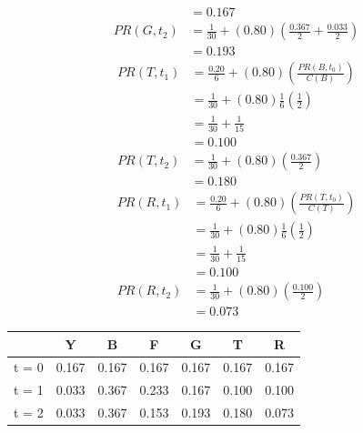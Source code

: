 \documentclass[11pt]{article}
\begin{document}
\begin{enumerate}
\begin{enumerate}
\begin{align*}
                &= 0.167 \\
                PR(G,t_{2}) &= \frac{1}{30}+(0.80)\left(\frac{0.367}{2}+\frac{0.033}{2}\right) \\
                &= 0.193
            \end{align*}
            \begin{align*}
                PR(T,t_{1}) &= \frac{0.20}{6}+(0.80)\left(\frac{PR(B,t_{0})}{C(B)}\right) \\
                &= \frac{1}{30}+(0.80)\frac{1}{6}\left(\frac{1}{2}\right) \\
                &= \frac{1}{30}+\frac{1}{15} \\
                &= 0.100 \\
                PR(T,t_{2}) &= \frac{1}{30}+(0.80)\left(\frac{0.367}{2}\right) \\
                &= 0.180
            \end{align*}
            \begin{align*}
                PR(R,t_{1}) &= \frac{0.20}{6}+(0.80)\left(\frac{PR(T,t_{0})}{C(T)}\right) \\
                &= \frac{1}{30}+(0.80)\frac{1}{6}\left(\frac{1}{2}\right) \\
                &= \frac{1}{30}+\frac{1}{15} \\
                &= 0.100 \\
                PR(R,t_{2}) &= \frac{1}{30}+(0.80)\left(\frac{0.100}{2}\right) \\
                &= 0.073
            \end{align*}
            \begin{table}[!ht]
                \centering
                \begin{tabular}[t]{|c|c|c|c|c|c|c|}
                    \hline
                    & \textbf{Y} & \textbf{B} & \textbf{F} & \textbf{G} & \textbf{T} & \textbf{R} \\
                    \hline
                    t = 0 & 0.167 & 0.167 & 0.167 & 0.167 & 0.167 & 0.167
                    \\ \hline
                    t = 1 & 0.033 & 0.367 & 0.233 & 0.167 & 0.100 & 0.100
                    \\ \hline
                    t = 2 & 0.033 & 0.367 & 0.153 & 0.193 & 0.180 & 0.073
                    \\ \hline
                \end{tabular}
            \end{table}


\end{enumerate}
\end{enumerate}
\end{document}
